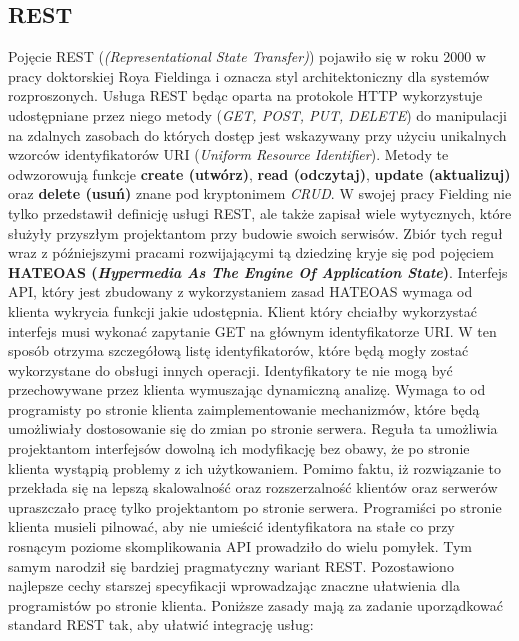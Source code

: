 \subsection{REST}
Pojęcie REST (\textit{(Representational State Transfer)}) pojawiło się w roku 2000 w pracy doktorskiej Roya Fieldinga\cite{thomas2000architectural} i oznacza styl architektoniczny dla systemów rozproszonych. Usługa REST będąc oparta na protokole HTTP wykorzystuje udostępniane przez niego metody (\textit{GET, POST, PUT, DELETE}) do manipulacji na zdalnych zasobach do których dostęp jest wskazywany przy użyciu unikalnych wzorców identyfikatorów URI (\textit{Uniform Resource Identifier}). Metody te odwzorowują funkcje \textbf{create (utwórz)}, \textbf{read (odczytaj)}, \textbf{update (aktualizuj)} oraz \textbf{delete (usuń)} znane pod kryptonimem \textit{CRUD}.\@
W swojej pracy Fielding nie tylko przedstawił definicję usługi REST, ale także zapisał wiele wytycznych, które służyły przyszłym projektantom przy budowie swoich serwisów. Zbiór tych reguł wraz z późniejszymi pracami rozwijającymi tą dziedzinę kryje się pod pojęciem \textbf{HATEOAS (\textit{Hypermedia As The Engine Of Application State})}. Interfejs API, który jest zbudowany z wykorzystaniem zasad HATEOAS wymaga od klienta wykrycia funkcji jakie udostępnia. Klient który chciałby wykorzystać interfejs musi wykonać zapytanie GET na głównym identyfikatorze URI. W ten sposób otrzyma szczegółową listę identyfikatorów, które będą mogły zostać wykorzystane do obsługi innych operacji. Identyfikatory te nie mogą być przechowywane przez klienta wymuszając dynamiczną analizę. Wymaga to od programisty po stronie klienta zaimplementowanie mechanizmów, które będą umożliwiały dostosowanie się do zmian po stronie serwera. Reguła ta umożliwia projektantom interfejsów dowolną ich modyfikację bez obawy, że po stronie klienta wystąpią problemy z ich użytkowaniem. Pomimo faktu, iż rozwiązanie to przekłada się na lepszą skalowalność oraz rozszerzalność klientów oraz serwerów upraszczało pracę tylko projektantom po stronie serwera. Programiści po stronie klienta musieli pilnować, aby nie umieścić identyfikatora na stałe co przy rosnącym poziome skomplikowania API prowadziło do wielu pomyłek. Tym samym narodził się bardziej pragmatyczny wariant REST. Pozostawiono najlepsze cechy starszej specyfikacji wprowadzając znaczne ułatwienia dla programistów po stronie klienta.
Poniższe zasady mają za zadanie uporządkować standard REST tak, aby ułatwić integrację usług\cite{jacobson2015interfejspragmaticrest}:
